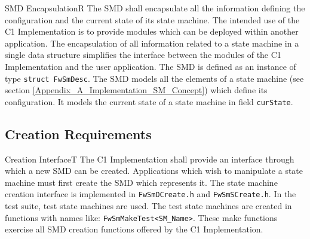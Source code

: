 \documentclass[requirements]{../fwprofile}
\begin{document}
\begin{fw_req}{SMD Encapsulation}{R}
{The SMD shall encapsulate all the information defining the configuration and the current state of its state machine.}
{The intended use of the C1 Implementation is to provide modules which can be deployed within another application. 
The encapsulation of all information related to a state machine in a single data structure simplifies the interface between the modules of the 
C1 Implementation and the user application.}
{The SMD is defined as an instance of type \texttt{struct FwSmDesc}.} 
{The SMD models all the elements of a state machine (see 
section \ref{Appendix_A_Implementation_SM_Concept}) which define its configuration.
It models the current state of a state machine in field \texttt{curState}.}
\end{fw_req}

\subsection{Creation Requirements}\label{req:creationInterface}

\begin{fw_req}{Creation Interface}{T}
{ The C1 Implementation shall provide an interface through which a new SMD can be created.}
{Applications which wish to manipulate a state machine must first create the SMD which represents it.}
{The state machine creation interface is implemented in \texttt{FwSmDCreate.h} and \texttt{FwSmSCreate.h}.} 
{In the test suite, test state machines are used. The test state machines are created in functions with names like: \texttt{FwSmMakeTest<SM\_Name>}. 
These make functions exercise all SMD creation functions offered by the C1 Implementation.}
\end{fw_req}
\end{document}
